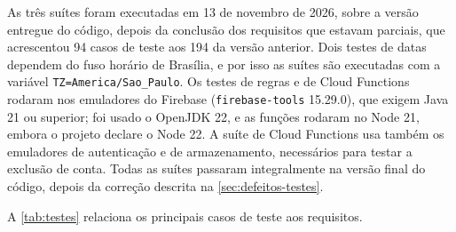 As três suítes foram executadas em 13 de novembro de 2026, sobre a versão entregue do código,
depois da conclusão dos requisitos que estavam parciais, que acrescentou
94 casos de teste aos 194 da versão anterior. Dois testes de datas
dependem do fuso horário de Brasília, e por isso as suítes são executadas
com a variável \texttt{TZ=America/Sao\_Paulo}. Os testes de
regras e de Cloud Functions rodaram nos emuladores do Firebase
(\texttt{firebase-tools} 15.29.0), que exigem Java 21 ou superior; foi
usado o OpenJDK 22, e as funções rodaram no Node 21, embora o projeto
declare o Node 22. A suíte de Cloud Functions usa também os emuladores de
autenticação e de armazenamento, necessários para testar a exclusão de
conta. Todas as suítes passaram integralmente na versão final
do código, depois da correção descrita na
\autoref{sec:defeitos-testes}.

A \autoref{tab:testes} relaciona os principais casos de teste aos
requisitos.

